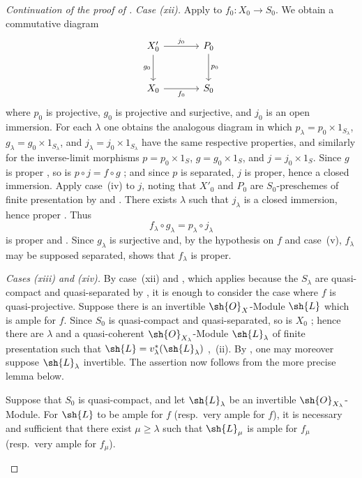 \begin{proof}[Continuation of the proof of ]
\emph{Case (xii).} Apply  to $f_0:X_0\to S_0$. We obtain a commutative diagram
\[
\begin{tikzcd}[column sep=large,row sep=large]
X'_0 \arrow[r,"j_0"] \arrow[d,"g_0"'] & P_0 \arrow[d,"p_0"] \\
X_0 \arrow[r,"f_0"'] & S_0
\end{tikzcd}
\]
where $p_0$ is projective, $g_0$ is projective and surjective, and $j_0$ is an open immersion. For each $\lambda$ one obtains the analogous diagram in which $p_\lambda=p_0\times1_{S_\lambda}$, $g_\lambda=g_0\times1_{S_\lambda}$, and $j_\lambda=j_0\times1_{S_\lambda}$ have the same respective properties, and similarly for the inverse-limit morphisms $p=p_0\times1_S$, $g=g_0\times1_S$, and $j=j_0\times1_S$. Since $g$ is proper , so is $p\circ j=f\circ g$ ; and since $p$ is separated, $j$ is proper, hence a closed immersion. Apply case~(iv) to $j$, noting that $X'_0$ and $P_0$ are $S_0$-preschemes of finite presentation by  and . There exists $\lambda$ such that $j_\lambda$ is a closed immersion, hence proper . Thus
\[
  f_\lambda\circ g_\lambda=p_\lambda\circ j_\lambda
\]
is proper  and . Since $g_\lambda$ is surjective and, by the hypothesis on $f$ and case~(v), $f_\lambda$ may be supposed separated,  shows that $f_\lambda$ is proper.

\emph{Cases (xiii) and (xiv).} By case~(xii) and , which applies because the $S_\lambda$ are quasi-compact and quasi-separated by , it is enough to consider the case where $f$ is quasi-projective. Suppose there is an invertible $\sh{O}_X$-Module $\sh{L}$ which is ample for $f$. Since $S_0$ is quasi-compact and quasi-separated, so is $X_0$ ; hence there are $\lambda$ and a quasi-coherent $\sh{O}_{X_\lambda}$-Module $\sh{L}_\lambda$ of finite presentation such that $\sh{L}=v_\lambda^*(\sh{L}_\lambda)$ ,~(ii). By , one may moreover suppose $\sh{L}_\lambda$ invertible. The assertion now follows from the more precise lemma below.

\begin{lemma}[8.10.5.2]
\label{IV.8.10.5.2}
Suppose that $S_0$ is quasi-compact, and let $\sh{L}_\lambda$ be an invertible $\sh{O}_{X_\lambda}$-Module. For $\sh{L}$ to be ample for $f$ (resp.\ very ample for $f$), it is necessary and sufficient that there exist $\mu\geqslant\lambda$ such that $\sh{L}_\mu$ is ample for $f_\mu$ (resp.\ very ample for $f_\mu$).
\end{lemma}


\end{proof}
